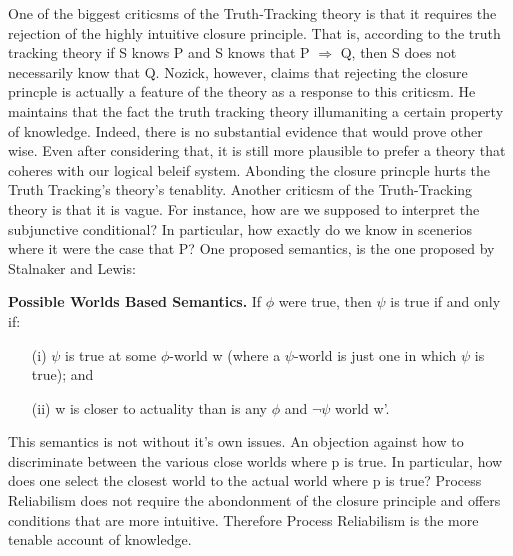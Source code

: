 \documentclass{article}
\begin{document}
One of the biggest criticsms of the Truth-Tracking theory is that it requires
the rejection of the highly intuitive closure principle. That is, according
to the truth tracking theory if S knows P and S  knows that  P $\Rightarrow$ Q,
then S does not necessarily know that Q. Nozick, however, claims that rejecting
the closure princple is actually a feature of the theory as a response to this
criticsm. He maintains that the fact the truth tracking theory illumaniting a
certain property of knowledge. Indeed, there is no substantial evidence that would
prove other wise. Even after considering that, it is still more plausible
to prefer a theory that coheres with our logical beleif system. Abonding the
closure princple hurts the Truth Tracking's theory's tenablity. Another criticsm
of the Truth-Tracking theory is that it is vague. For instance, how are we
supposed to interpret the subjunctive conditional? In particular, how exactly
do we know in scenerios where it were the case that P? One proposed semantics, is
the one proposed by Stalnaker and Lewis:
\begin{displayquote}
  \textbf{Possible Worlds Based Semantics.}
  If $\phi$ were true, then $\psi$ is true if and only if:
  \begin{enumerate}
    \item[(i)] $\psi$ is true at some $\phi$-world w
    (where a $\psi$-world is just one in which $\psi$ is true); and
    \item[(ii)] w is closer to actuality than is any $\phi$ and $\neg \psi$
    world w'.
  \end{enumerate}
\end{displayquote}
This semantics is not without it's own issues. An objection against how
to discriminate between the various close worlds where p is true. In particular,
how does one select the closest world to the actual world where p is true? Process
Reliabilism does not require the abondonment of the closure principle and offers
conditions that are more intuitive. Therefore Process Reliabilism is the more
tenable account of knowledge.
\end{document}
